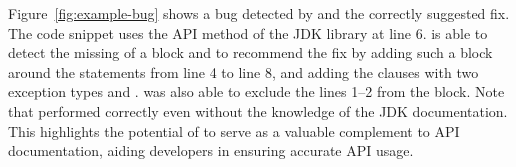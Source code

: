 Figure~\ref{fig:example-bug} shows a bug detected by {\tool} and the
correctly suggested fix. The code snippet uses the API method
 of the JDK library at line 6. {\tool} is able to
detect the missing of a  block and to recommend the
fix by adding such a block around the statements from line 4 to line
8, and adding the  clauses with two exception types
 and
. {\xstate} was also able to exclude the
lines 1--2 from the  block. Note that {\tool} performed
correctly even without the knowledge of the JDK documentation.  This
highlights the potential of {\tool} to serve as a valuable complement
to API documentation, aiding developers in ensuring accurate API
usage.




%



